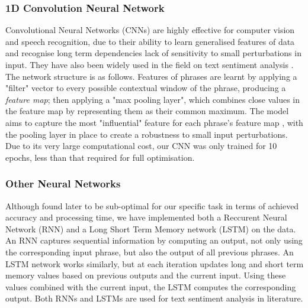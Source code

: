 \documentclass{article}
\begin{document}
\subsubsection*{1D Convolution Neural Network}
Convolutional Neural Networks (CNNs) are highly effective for computer vision and speech recognition\cite{Cai2019AnalysisOT}, due to their ability to learn generalised features of data and recognise long term dependencies\cite{chaudhary_2020} lack of sensitivity to small perturbations in input. They have also been widely used in the field on text sentiment analysis \cite{wang-etal-2016-combination}\cite{Cai2019AnalysisOT}\cite{10.1007/978-3-030-67537-0_19}\cite{xue-li-2018-aspect}. The network structure is as follows. Features of phrases are learnt by applying a "filter" vector to every possible contextual window of the phrase, producing a \textit{feature map}; then applying a "max pooling layer", which combines close values in the feature map by representing them as their common maximum. The model aims to capture the most "influential" feature for each phrase's feature map \cite{Cai2019AnalysisOT}, with the pooling layer in place to create a robustness to small input perturbations. Due to its very large computational cost, our CNN was only trained for 10 epochs, less than that required for full optimisation.
\subsubsection*{Other Neural Networks}
Although found later to be sub-optimal for our specific task in terms of achieved accuracy and processing time, we have implemented both a Reccurent Neural Network (RNN) and a Long Short Term Memory network (LSTM) on the data. An RNN captures sequential information\cite{chaudhary_2020} by computing an output, not only using the corresponding input phrase, but also the output of all previous phrases. An LSTM network works similarly, but at each iteration updates long and short term memory values based on previous outputs and the current input. Using these values combined with the current input, the LSTM computes the corresponding output. Both RNNs and LSTMs are used for text sentiment analysis in literature\cite{10.1145/3302425.3302469}\cite{article33}\cite{10.1007/978-3-030-67537-0_19}\cite{DBLP:journals/corr/RuderGB16}.
\end{document}
